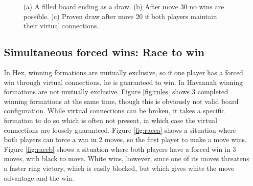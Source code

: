 \begin{figure}
	\centering
	\subfloat[]{\label{fig:drawproven}
		\begin{HavannahBoard}[board size=4,coordinate style=classical,show coordinates=false]
		\HGame{g7,a1,f5,g4,e3,d2,e2,d1,c2,d3,c3,f7,d6,b4,a4,b5,a3,e5,c4,b3}%
		\end{HavannahBoard}
	}
	\caption{(a) A filled board ending as a draw. (b) After move 30 no wins are possible. (c) Proven draw after move 20 if both players maintain their virtual connections.}
	\label{fig:draw}
\end{figure}



\subsection{Simultaneous forced wins: Race to win}

In Hex, winning formations are mutually exclusive, so if one player has a forced win through virtual connections, he is guaranteed to win. In Havannah winning formations are not mutually exclusive. Figure \ref{fig:rules} shows 3 completed winning formations at the same time, though this is obviously not  valid board configuration. While virtual connections can be broken, it takes a specific formation to do so which is often not present, in which case the virtual connections are loosely guaranteed. Figure \ref{fig:racea} shows a situation where both players can force a win in 2 moves, so the first player to make a move wins. Figure \ref{fig:raceb} shows a situation where both players have a forced win in 3 moves, with black to move. White wins, however, since one of its moves threatens a faster ring victory, which is easily blocked, but which gives white the move advantage and the win.


